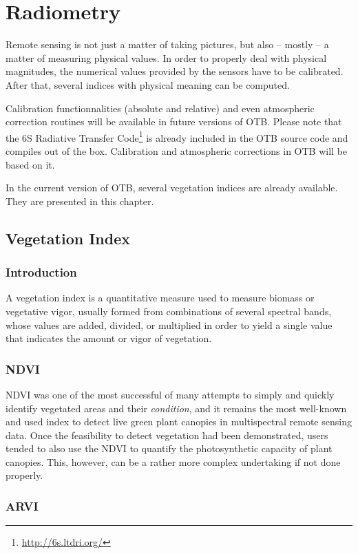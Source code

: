 \chapter{ Radiometry }

Remote sensing is not just a matter of taking pictures, but also --
mostly -- a matter of measuring physical values. In order to properly
deal with physical magnitudes, the numerical values provided by the
sensors have to be calibrated. After that, several indices with
physical meaning can be computed.

Calibration functionnalities (absolute and relative) and even
atmospheric correction routines will be available in future versions
of OTB. Please note that the 6S Radiative Transfer Code\footnote{\url{http://6s.ltdri.org/}} is already included in the OTB source code and
compiles out of the box. Calibration and atmospheric corrections in
OTB will be based on it.

In the current version of OTB, several vegetation indices are already
available. They are presented in this chapter.


\section{Vegetation Index}
\label{sec:VegetationIndex}

\subsection{Introduction}
A vegetation index is a quantitative measure used to measure biomass
or vegetative vigor, usually formed from combinations of several
spectral bands, whose values are added, divided, or multiplied in
order to yield a single value that indicates the amount or vigor of
vegetation.

\subsection{NDVI}
\label{secNDVI}
NDVI was one of the most successful of many attempts to simply and
quickly identify vegetated areas and their {\em condition}, and it remains
the most well-known and used index to detect live green plant canopies
in multispectral remote sensing data. Once the feasibility to detect
vegetation had been demonstrated, users tended to also use the NDVI to
quantify the photosynthetic capacity of plant canopies. This, however,
can be a rather more complex undertaking if not done properly.


\subsection{ARVI}
\label{secARVI}




